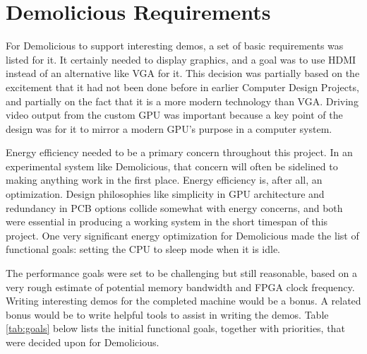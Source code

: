 \documentclass[../main/report.tex]{subfiles}
\begin{document}
\section{Demolicious Requirements}

For Demolicious to support interesting demos, a set of basic requirements was listed for it.
It certainly needed to display graphics, and a goal was to use HDMI instead of an alternative like VGA for it.
This decision was partially based on the excitement that it had not been done before in earlier Computer Design Projects, and partially on the fact that it is a more modern technology than VGA.
Driving video output from the custom GPU was important because a key point of the design was for it to mirror a modern GPU's purpose in a computer system.

Energy efficiency needed to be a primary concern throughout this project.
In an experimental system like Demolicious, that concern will often be sidelined to making anything work in the first place.
Energy efficiency is, after all, an optimization.
Design philosophies like simplicity in GPU architecture and redundancy in PCB options collide somewhat with energy concerns, and both were essential in producing a working system in the short timespan of this project.
One very significant energy optimization for Demolicious made the list of functional goals: setting the CPU to sleep mode when it is idle.

The performance goals were set to be challenging but still reasonable, based on a very rough estimate of potential memory bandwidth and FPGA clock frequency.
Writing interesting demos for the completed machine would be a bonus.
A related bonus would be to write helpful tools to assist in writing the demos.
Table \ref{tab:goals} below lists the initial functional goals, together with priorities, that were decided upon for Demolicious.
\end{document}
